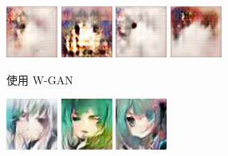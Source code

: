 \documentclass[fleqn,a4paper,12pt]{article}
\begin{document}
\begin{figure}[H]
\centering
\begin{subfigure}{0.45\textwidth}
  \includegraphics[width=0.2\linewidth]{imgs/wgan/0-4-0.jpg}
  \includegraphics[width=0.2\linewidth]{imgs/wgan/10-0-0.jpg}
  \includegraphics[width=0.2\linewidth]{imgs/wgan/4-5-0.jpg}
  \includegraphics[width=0.2\linewidth]{imgs/wgan/5-3-0.jpg}
  \caption{使用 W-GAN}
\end{subfigure}
\begin{subfigure}{0.45\textwidth}
  \includegraphics[width=0.2\linewidth]{imgs/iwgan-230-original-loss/0-4-0.jpg}
  \includegraphics[width=0.2\linewidth]{imgs/iwgan-230-original-loss/10-0-0.jpg}
  \includegraphics[width=0.2\linewidth]{imgs/iwgan-230-original-loss/4-5-0.jpg}

\end{subfigure}
\end{figure}
\end{document}

